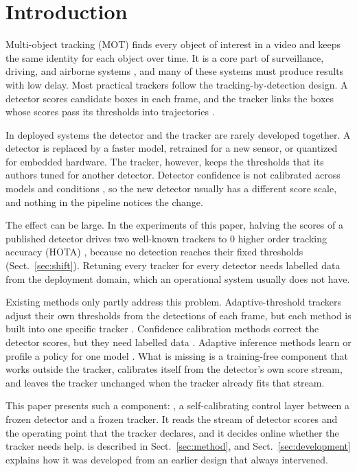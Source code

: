 \section{Introduction}\label{sec:intro}

Multi-object tracking (MOT) finds every object of interest in a video and
keeps the same identity for each object over time. It is a core part of
surveillance, driving, and airborne systems
\cite{zhu2022visdrone,wu2022uavsurvey,lu2024uavdetection}, and many of these systems
must produce results with low delay. Most practical trackers follow the
tracking-by-detection design. A detector scores candidate boxes in each frame,
and the tracker links the boxes whose scores pass its thresholds into
trajectories \cite{bewley2016sort,zhang2022bytetrack,cao2023ocsort}.

In deployed systems the detector and the tracker are rarely developed
together. A detector is replaced by a faster model, retrained for a new
sensor, or quantized for embedded hardware. The tracker, however, keeps the
thresholds that its authors tuned for another detector. Detector confidence is
not calibrated across models and conditions \cite{kuppers2020detcalib}, so the
new detector usually has a different score scale, and nothing in the pipeline
notices the change.

The effect can be large. In the experiments of this paper, halving the scores
of a published detector drives two well-known trackers to 0 higher order
tracking accuracy (HOTA) \cite{luiten2021hota}, because no detection reaches
their fixed thresholds (Sect.~\ref{sec:shift}). Retuning
every tracker for every detector needs labelled data from the deployment
domain, which an operational system usually does not have.

Existing methods only partly address this problem. Adaptive-threshold
trackers adjust their own thresholds from the detections of each frame, but
each method is built into one specific tracker
\cite{ma2023adaptivebytetrack,shim2024adaptrack,act2026adaptive}. Confidence
calibration methods correct the detector scores, but they need labelled data
\cite{kuppers2020detcalib}. Adaptive inference methods learn or profile a
policy for one model \cite{han2022dynamic,jiang2018chameleon}. What is missing
is a training-free component that works outside the tracker, calibrates itself
from the detector's own score stream, and leaves the tracker unchanged when
the tracker already fits that stream.

This paper presents such a component: \scl{}, a self-calibrating control layer
between a frozen detector and a frozen tracker. It reads the stream of detector scores
and the operating point that the tracker declares, and it decides online
whether the tracker needs help. \scl{} is described in
Sect.~\ref{sec:method}, and Sect.~\ref{sec:development} explains how it was
developed from an earlier design that always intervened.

